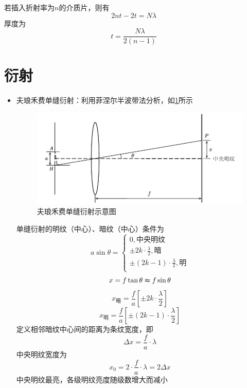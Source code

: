 \documentclass[12pt, a4paper, twoside]{ctexbook}
\begin{document}
\begin{itemize}
    若插入折射率为$n$的介质片，则有
    $$
    2nt-2t=N\lambda
    $$
    厚度为
    $$
    t=\frac{N\lambda}{2\left(n-1\right)}
    $$
\end{itemize}
\section{衍射}
\begin{itemize}
    \item {\sonti 夫琅禾费单缝衍射}：利用菲涅尔半波带法分析，如\textcolor{blue}{\cref{fig:夫琅禾费单缝衍射}}所示
    \begin{figure}[H]
        \centerline{\includegraphics[scale=0.90]{夫琅禾费单缝衍射.pdf}}
        \caption{夫琅禾费单缝衍射示意图}\label{fig:夫琅禾费单缝衍射}
    \end{figure}
    单缝衍射的明纹（中心）、暗纹（中心）条件为
    $$
    a\sin\theta=\left\{ \begin{array}{l}
        0,\text{中央明纹}\\
        \pm 2k\cdot \frac{\lambda}{2},\text{暗}\\
        \pm \left( 2k-1 \right) \cdot \frac{\lambda}{2},\text{明}\\
    \end{array} \right. 
    $$
    $$
    x=f\tan\theta\thickapprox f\sin\theta
    $$
    $$
    x_\text{暗}=\frac{f}{a}\left[\pm 2k\cdot\frac{\lambda}{2}\right]
    $$
    $$
    x_\text{明}=\frac{f}{a}\left[\pm\left(2k-1\right)\cdot\frac{\lambda}{2}\right]
    $$
    定义相邻暗纹中心间的距离为条纹宽度，即
    $$
    \Delta x=\frac{f}{a}\cdot\lambda
    $$
    中央明纹宽度为
    $$
    x_0=2\cdot\frac{f}{a}\cdot\lambda=2\Delta x
    $$
    中央明纹最亮，各级明纹亮度随级数增大而减小
    

\end{itemize}
\end{document}
